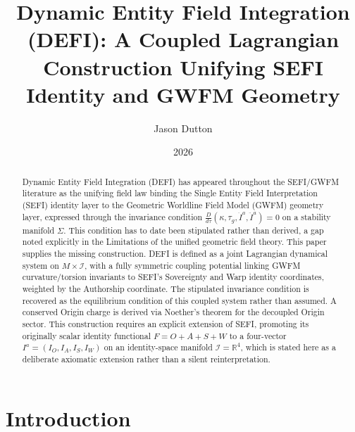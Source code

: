 \documentclass[aip,jmp,reprint,onecolumn,nofootinbib]{revtex4-2}
\begin{document}
\title{Dynamic Entity Field Integration (DEFI): A Coupled Lagrangian Construction Unifying SEFI Identity and GWFM Geometry}

\author{Jason Dutton}

\date{2026}

\begin{abstract}
Dynamic Entity Field Integration (DEFI) has appeared throughout the SEFI/GWFM
literature as the unifying field law binding the Single Entity Field Interpretation
(SEFI) identity layer to the Geometric Worldline Field Model (GWFM) geometry
layer, expressed through the invariance condition
$\frac{D}{d\tau}(\kappa,\tau_g,\dot I^a,\ddot I^a)=0$ on a stability manifold $\Sigma$.
This condition has to date been stipulated rather than derived, a gap noted
explicitly in the Limitations of the unified geometric field theory. This paper
supplies the missing construction. DEFI is defined as a joint Lagrangian dynamical
system on $M\times\mathcal{I}$, with a fully symmetric coupling potential linking
GWFM curvature/torsion invariants to SEFI's Sovereignty and Warp identity
coordinates, weighted by the Authorship coordinate. The stipulated invariance
condition is recovered as the equilibrium condition of this coupled system rather
than assumed. A conserved Origin charge is derived via Noether's theorem for the
decoupled Origin sector. This construction requires an explicit extension of SEFI,
promoting its originally scalar identity functional $F=O+A+S+W$ to a four-vector
$I^a=(I_O,I_A,I_S,I_W)$ on an identity-space manifold $\mathcal{I}=\mathbb{R}^4$,
which is stated here as a deliberate axiomatic extension rather than a silent
reinterpretation.
\end{abstract}

\maketitle

\section{Introduction}
\end{document}
